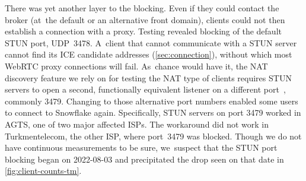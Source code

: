 \documentclass[letterpaper,twocolumn]{article}
\begin{document}
There was yet another layer to the blocking.
Even if they could contact the broker
(at~the default or an alternative front domain),
clients could not then establish a connection with a proxy.
Testing revealed blocking of the default STUN port, UDP~3478.
A~client that cannot communicate with a STUN server
cannot find its ICE candidate addresses (\autoref{sec:connection}),
without which most WebRTC proxy connections will fail.
As~chance would have it, the NAT discovery feature we rely on
for testing the NAT type of clients requires
STUN servers to open a second, functionally equivalent listener
on a different port~\cite[\S 6]{rfc5780}, commonly 3479.
Changing to those alternative port numbers
enabled some users to connect to Snowflake again.
Specifically, STUN servers on port 3479 worked in AGTS,
one of two major affected ISPs.
The workaround did not work in Turkmentelecom, the other ISP,
where port~3479 was blocked.
Though we do not have continuous measurements to be sure,
we~suspect that the STUN port blocking began on \mbox{2022-08-03}
and precipitated the drop seen on that date in \autoref{fig:client-counts-tm}.
\end{document}
